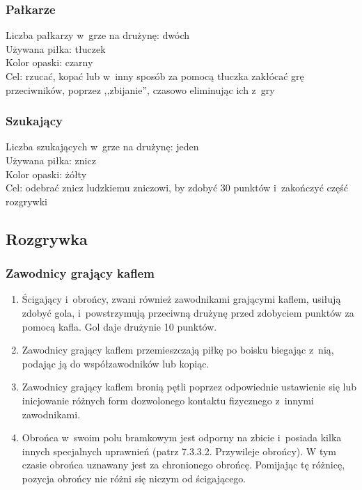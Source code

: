 \documentclass[12pt,a4paper]{article}
\begin{document}
\subsubsection{Pałkarze}
Liczba pałkarzy w~grze na drużynę: dwóch \\
Używana piłka: tłuczek \\
Kolor opaski: czarny \\
Cel: rzucać, kopać lub w~inny sposób za pomocą tłuczka zakłócać grę
przeciwników, poprzez ,,zbijanie'', czasowo eliminując ich z~gry

\subsubsection{Szukający}
Liczba szukających w~grze na drużynę: jeden \\
Używana piłka: znicz \\
Kolor opaski: żółty \\
Cel: odebrać znicz ludzkiemu zniczowi, by zdobyć 30 punktów i~zakończyć
część rozgrywki

\subsection{Rozgrywka}

\subsubsection{Zawodnicy grający kaflem}
\begin{enumerate}
	\item Ścigający i~obrońcy, zwani również zawodnikami grającymi kaflem,
	      usiłują zdobyć gola, i~powstrzymują przeciwną drużynę przed zdobyciem
	      punktów za pomocą kafla. Gol daje drużynie 10 punktów.

	\item Zawodnicy grający kaflem przemieszczają piłkę po boisku biegając z~nią, podając ją do współzawodników lub kopiąc.

	\item Zawodnicy grający kaflem bronią pętli poprzez odpowiednie ustawienie się lub inicjowanie
	      różnych form dozwolonego kontaktu fizycznego z~innymi zawodnikami.

	\item Obrońca w~swoim polu bramkowym jest odporny na zbicie i~posiada kilka
	      innych specjalnych uprawnień (patrz 7.3.3.2. Przywileje obrońcy).
	      W tym czasie obrońca uznawany jest za chronionego obrońcę. Pomijając tę różnicę, pozycja obrońcy nie różni się niczym od
	      ścigającego.
\end{enumerate}
\end{document}
